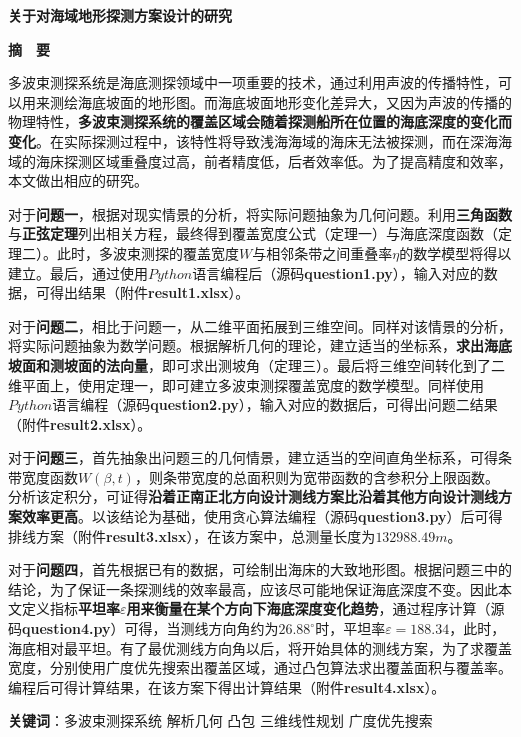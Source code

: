 \thispagestyle{empty}   %

\begin{center}
    \textbf{\fontsize{20}{1.5}关于对海域地形探测方案设计的研究}

    \textbf{摘　要}
\end{center}






多波束测探系统是海底测探领域中一项重要的技术，通过利用声波的传播特性，可以用来测绘海底坡面的地形图。而海底坡面地形变化差异大，又因为声波的传播的物理特性，\textbf{多波束测探系统的覆盖区域会随着探测船所在位置的海底深度的变化而变化}。在实际探测过程中，该特性将导致浅海海域的海床无法被探测，而在深海海域的海床探测区域重叠度过高，前者精度低，后者效率低。为了提高精度和效率，本文做出相应的研究。

对于\textbf{问题一}，根据对现实情景的分析，将实际问题抽象为几何问题。利用\textbf{三角函数}与\textbf{正弦定理}列出相关方程，最终得到覆盖宽度公式（定理一）与海底深度函数（定理二）。此时，多波束测探的覆盖宽度$W$与相邻条带之间重叠率$\eta$的数学模型将得以建立。最后，通过使用$Python$语言编程后（源码\textbf{question1.py}），输入对应的数据，可得出结果（附件\textbf{result1.xlsx}）。

对于\textbf{问题二}，相比于问题一，从二维平面拓展到三维空间。同样对该情景的分析，将实际问题抽象为数学问题。根据解析几何的理论，建立适当的坐标系，\textbf{求出海底坡面和测坡面的法向量}，即可求出测坡角（定理三）。最后将三维空间转化到了二维平面上，使用定理一，即可建立多波束测探覆盖宽度的数学模型。同样使用$Python$语言编程（源码\textbf{question2.py}），输入对应的数据后，可得出问题二结果（附件\textbf{result2.xlsx}）。

对于\textbf{问题三}，首先抽象出问题三的几何情景，建立适当的空间直角坐标系，可得条带宽度函数$W(\beta,t)$，则条带宽度的总面积则为宽带函数的含参积分上限函数。分析该定积分，可证得\textbf{沿着正南正北方向设计测线方案比沿着其他方向设计测线方案效率更高}。以该结论为基础，使用贪心算法编程（源码\textbf{question3.py}）后可得排线方案（附件\textbf{result3.xlsx}），在该方案中，总测量长度为$132988.49m$。

对于\textbf{问题四}，首先根据已有的数据，可绘制出海床的大致地形图。根据问题三中的结论，为了保证一条探测线的效率最高，应该尽可能地保证海底深度不变。因此本文定义指标\textbf{平坦率$\varepsilon$用来衡量在某个方向下海底深度变化趋势}，通过程序计算（源码\textbf{question4.py}）可得，当测线方向角约为$26.88^\circ$时，平坦率$\varepsilon=188.34$，此时，海底相对最平坦。有了最优测线方向角以后，将开始具体的测线方案，为了求覆盖宽度，分别使用广度优先搜索出覆盖区域，通过凸包算法求出覆盖面积与覆盖率。编程后可得计算结果，在该方案下得出计算结果（附件\textbf{result4.xlsx}）。

\quad\newline
\newline
\textbf{关键词}：多波束测探系统 \quad 解析几何 \quad 凸包 \quad 三维线性规划 \quad 广度优先搜索
